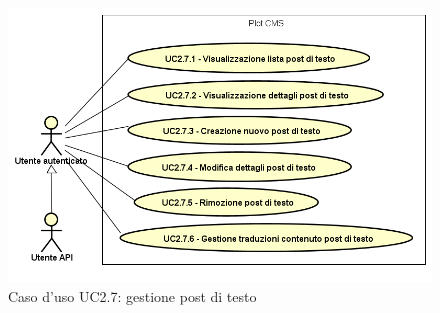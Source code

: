        \begin{figure}[H]
            \centering
            \includegraphics[scale=0.95, width=\textwidth]{immagini/usecase/UC2-7.png}
            \caption{Caso d'uso UC2.7: gestione post di testo}\label{fig:UC2.7} 
        \end{figure}
